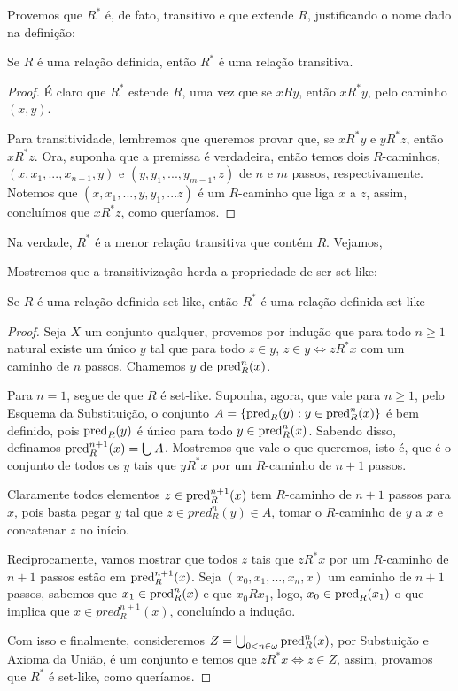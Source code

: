 Provemos que $R^*$ é, de fato, transitivo e que extende $R$, justificando o nome dado na definição:

\begin{proposition}
    Se $R$ é uma relação definida, então $R^*$ é uma relação transitiva.
\end{proposition}
\begin{proof}
    É claro que $R^*$ estende $R$, uma vez que se $xRy$, então $xR^* y$, pelo caminho $(x,y)$. 
    
    Para transitividade, lembremos que queremos provar que, se $xR^*y$ e $yR^*z$, então $xR^*z$. Ora, suponha que a premissa é verdadeira, então temos dois $R$-caminhos, $(x, x_1,...,x_{n-1},y)$ e $(y,y_1,...,y_{m-1}, z)$ de $n$ e $m$ passos, respectivamente. Notemos que $(x,x_1,...,y,y_1,...z)$ é um $R$-caminho que liga $x$ a $z$, assim, concluímos que $xR^*z$, como queríamos.
\end{proof}

\begin{remark}
    Na verdade, $R^*$ é a menor relação transitiva que contém $R$. Vejamos, \pending
\end{remark}

Mostremos que a transitivização herda a propriedade de ser set-like:

\begin{proposition}
    Se $R$ é uma relação definida set-like, então $R^*$ é uma relação definida set-like
\end{proposition}
\begin{proof}
    Seja $X$ um conjunto qualquer, provemos por indução que para todo $n \geq 1$ natural existe um único $y$ tal que para todo $z \in y$, $z\in y \iff zR^*x$ com um caminho de $n$ passos. Chamemos $y$ de $\operatorname{pred}_R^n(x)$.

    Para $n=1$, segue de que $R$ é set-like. Suponha, agora, que vale para $n \geq 1$, pelo Esquema da Substituição, o conjunto $A = \left\{ \operatorname{pred}_R(y) : y \in \operatorname{pred}_R^n(x) \right\}$ é bem definido, pois $\operatorname{pred}_R(y)$ é único para todo $y\in \operatorname{pred}_R^n(x)$. Sabendo disso, definamos $\operatorname{pred}_R^{n+1}(x) = \bigcup A$. Mostremos que vale o que queremos, isto é, que é o conjunto de todos os $y$ tais que $yR^*x$ por um $R$-caminho de $n + 1$ passos.
    
    Claramente todos elementos $z \in \operatorname{pred}_R^{n+1}(x)$ tem $R$-caminho de $n + 1$ passos para $x$, pois basta pegar $y$ tal que $z\in pred_R^n(y) \in A$, tomar o $R$-caminho de $y$ a $x$ e concatenar $z$ no início. 
    
    Reciprocamente, vamos mostrar que todos $z$ tais que $zR^*x$ por um $R$-caminho de $n + 1$ passos estão em $\operatorname{pred}_R^{n+1}(x)$. Seja $(x_0, x_1,...,x_n,x)$ um caminho de $n + 1$ passos, sabemos que $x_1 \in \operatorname{pred}_R^n(x)$ e que $x_0R x_1$, logo, $x_0 \in \operatorname{pred}_R(x_1)$ o que implica que $x\in pred_R^{n+1}(x)$, concluíndo a indução. 

    Com isso e finalmente, consideremos $Z = \bigcup_{0 < n \in \omega}\operatorname{pred}_R^n(x)$, por Substuição e Axioma da União, é um conjunto e temos que $zR^*x \iff z \in Z$, assim, provamos que $R^*$ é set-like, como queríamos.
\end{proof}

